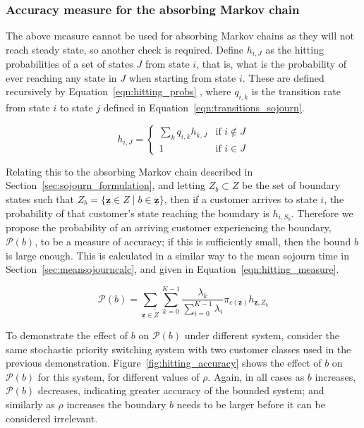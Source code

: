 \documentclass{article}
\begin{document}
\subsubsection{Accuracy measure for the absorbing Markov chain}\label{sec:absorbing_accuracy}
The above measure cannot be used for absorbing Markov chains as they will not
reach steady state, so another check is required. Define $h_{i,J}$ as the
hitting probabilities of a set of states $J$ from state $i$, that is, what is
the probability of ever reaching any state in $J$ when starting from state $i$.
These are defined recursively by Equation~\ref{eqn:hitting_probs}
\cite{privault13}, where $q_{i,k}$ is the transition rate from state $i$ to
state $j$ defined in Equation~\ref{eqn:transitions_sojourn}.

\begin{equation}\label{eqn:hitting_probs}
h_{i,J} = \begin{cases}
\sum_k q_{i,k} h_{k,J} & \text{if } i \notin J \\
1 & \text{if } i \in J
\end{cases}
\end{equation}

Relating this to the absorbing Markov chain described in
Section~\ref{sec:sojourn_formulation}, and letting $Z_b \subset Z$ be the set of
boundary states such that
$Z_b = \{\underline{\mathbf{z}} \in Z \; | \; b \in \underline{\mathbf{z}}\}$,
then if a customer arrives to state $i$, the probability of that customer's
state reaching the boundary is $h_{i,S_b}$. Therefore we propose the probability
of an arriving customer experiencing the boundary, $\mathcal{P}(b)$, to be a
measure of accuracy; if this is sufficiently small, then the bound $b$ is large
enough. This is calculated in a similar way to the mean sojourn time in
Section~\ref{sec:meansojourncalc}, and given in Equation~\ref{eqn:hitting_measure}.

\begin{equation}\label{eqn:hitting_measure}
\mathcal{P}(b) = \sum_{\underline{\mathbf{z}} \in \tilde{Z}} \sum_{k=0}^{K-1} \frac{\lambda_k}{\sum_{i=0}^{K-1} \lambda_i} \pi_{c(\underline{\mathbf{z}})} h_{\underline{\mathbf{z}}, Z_b}
\end{equation}

To demonstrate the effect of $b$ on $\mathcal{P}(b)$ under different system,
consider the same stochastic priority switching system with two customer classes
used in the previous demonstration. Figure~\ref{fig:hitting_accuracy} shows the
effect of $b$ on $\mathcal{P}(b)$ for this system, for different values of $\rho$.
Again, in all cases as $b$ increases, $\mathcal{P}(b)$ decreases, indicating
greater accuracy of the bounded system; and similarly as $\rho$ increases the
boundary $b$ needs to be larger before it can be considered irrelevant.
\end{document}
